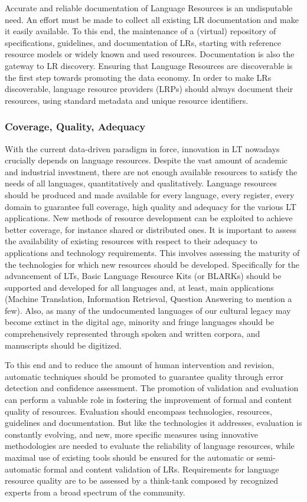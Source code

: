 \documentclass[10pt, plain]{../../metanetpaper}
\begin{document}
\begin{multicols}{2}
Accurate and reliable documentation of Language Resources is an undisputable need. An effort must be made to collect all existing LR documentation and make it easily available. To this end, the maintenance of a (virtual) repository of specifications, guidelines, and documentation of LRs, starting with reference resource models or widely known and used resources. Documentation is also the gateway to LR discovery. Ensuring that Language Resources are discoverable is the first step towards promoting the data economy. In order to make LRs discoverable, language resource providers (LRPs) should always document their resources, using standard metadata and unique resource identifiers. 

\subsubsection{Coverage, Quality, Adequacy}
\label{sec:cover-qual-adeq}

With the current data-driven paradigm in force, innovation in LT nowadays crucially depends on language resources. Despite the vast amount of academic and industrial investment, there are not enough available resources to satisfy the needs of all languages, quantitatively and qualitatively. Language resources should be produced and made available for every language, every register, every domain to guarantee full coverage, high quality and adequacy for the various LT applications. New methods of resource development can be exploited to achieve better coverage, for instance shared or distributed ones. It is important to assess the availability of existing resources with respect to their adequacy to applications and technology requirements. This involves assessing the maturity of the technologies for which new resources should be developed.
Specifically for the advancement of LTs, Basic Language Resource Kits (or BLARKs) should be supported and developed for all languages and, at least, main applications (Machine Translation, Information Retrieval, Question Answering to mention a few). Also, as many of the undocumented languages of our cultural legacy may become extinct in the digital age, minority and fringe languages should be comprehensively represented through spoken and written corpora, and manuscripts should be digitized.

To this end and to reduce the amount of human intervention and revision, automatic techniques should be promoted to guarantee quality through error detection and confidence assessment. The promotion of validation and evaluation can perform a valuable role in fostering the improvement of formal and content quality of resources. Evaluation should encompass technologies, resources, guidelines and documentation. But like the technologies it addresses, evaluation is constantly evolving, and new, more specific measures using innovative methodologies are needed to evaluate the reliability of language resources, while maximal use of existing tools should be ensured for the automatic or semi-automatic formal and content validation of LRs. Requirements for language resource quality are to be assessed by a think-tank composed by recognized experts from a broad spectrum of the community.


\end{multicols}
\end{document}
